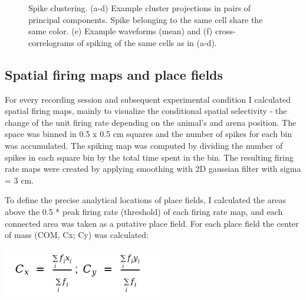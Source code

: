 \begin{figure}
\captionsetup{format=plain}
\caption[Spikesorting]{
Spike clustering. (a-d) Example cluster projections in pairs of principal components. Spike belonging to the same cell share the same color. (e) Example waveforms (mean) and (f) cross-correlograms of spiking of the same cells as in (a-d).
}
\label{fig:F34_spikesorting}
\end{figure}


\subsection{Spatial firing maps and place fields}

For every recording session and subsequent experimental condition I calculated spatial firing maps, mainly to visualize the conditional spatial selectivity - the change of the unit firing rate depending on the animal’s and arena position. The space was binned in 0.5 x 0.5 cm squares and the number of spikes for each bin was accumulated. The spiking map was computed by dividing the number of spikes in each square bin by the total time spent in the bin. The resulting firing rate maps were created by applying smoothing with 2D gaussian filter with sigma = 3 cm.

To define the precise analytical locations of place fields, I calculated the areas above the 0.5 * peak firing rate (threshold) of each firing rate map, and each connected area was taken as a putative place field. For each place field the center of mass (COM, Cx; Cy) was calculated:

\includegraphics[width=70mm]{assets/formula.png}

